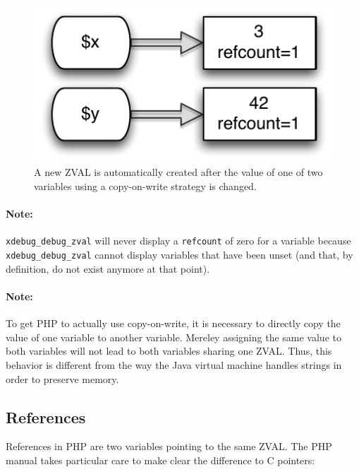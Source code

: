 \begin{figure}[htb]
  \begin{center}
    \includegraphics[scale=0.8]{images/x_3_y_42}
    \caption{A new ZVAL is automatically created after the value of one of two variables using a copy-on-write strategy is changed.}
    \label{fig:new-zval-after-copy-on-write}
  \end{center}
\end{figure}

\paragraph{Note:} \texttt{xdebug\_debug\_zval} will never display a \texttt{refcount} of zero for a variable because \texttt{xdebug\_debug\_zval} cannot display variables that have been unset (and that, by definition, do not exist anymore at that point).

\paragraph{Note:} To get PHP to actually use copy-on-write, it is necessary to directly copy the value of one variable to another variable. Mereley assigning the same value to both variables will not lead to both variables sharing one ZVAL. Thus, this behavior is different from the way the Java virtual machine handles strings in order to preserve memory.~\cite[chapter~2]{jvm-spec}


\subsection{References}
\label{sec:references}

References in PHP are two variables pointing to the same ZVAL. The PHP manual takes particular care to make clear the difference to C pointers:~\cite{php-manual-what-references-are}\cite{php-manual-what-references-are-not}

